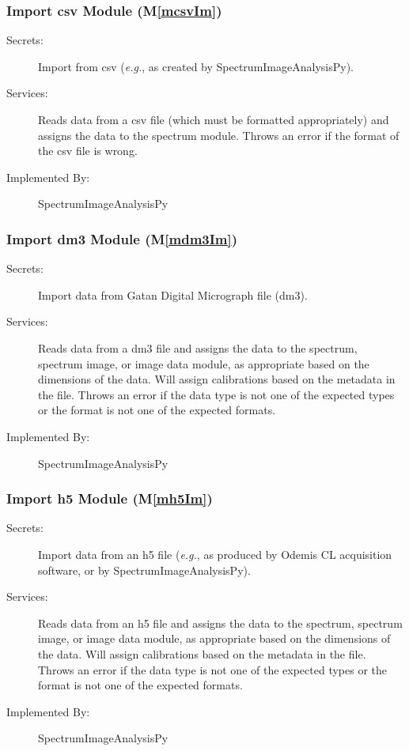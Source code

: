 \documentclass[12pt, titlepage]{article}
\newcommand{\mref}[1]{M\ref{#1}}
\newcommand{\progname}{SpectrumImageAnalysisPy}
\begin{document}
\subsubsection{Import csv Module (\mref{mcsvIm})}
\begin{description}
	\item[Secrets:]Import from csv (\textit{e.g.}, as created by \progname).
	\item[Services:]Reads data from a csv file (which must be formatted
appropriately) and assigns the data to the spectrum module. Throws an error if
the format of the csv file is wrong.
	\item[Implemented By:] \progname
\end{description}

\subsubsection{Import dm3 Module (\mref{mdm3Im})}
\begin{description}
	\item[Secrets:]Import data from Gatan Digital Micrograph file (dm3).
	\item[Services:]Reads data from a dm3 file and assigns the data to the
spectrum, spectrum image, or image data module, as appropriate based on the
dimensions of the data. Will assign calibrations based on the metadata in the
file. Throws an error if the data type is not one of the expected types or the
format is not one of the expected formats.
	\item[Implemented By:] \progname
\end{description}

\subsubsection{Import h5 Module (\mref{mh5Im})}
\begin{description}
	\item[Secrets:]Import data from an h5 file (\textit{e.g.}, as produced by
Odemis CL acquisition software, or by \progname).
	\item[Services:]Reads data from an h5 file and assigns the data to the
spectrum, spectrum image, or image data module, as appropriate based on the
dimensions of the data. Will assign calibrations based on the metadata in the
file. Throws an error if the data type is not one of the expected types or the
format is not one of the expected formats.
	\item[Implemented By:] \progname
\end{description}
\end{document}
